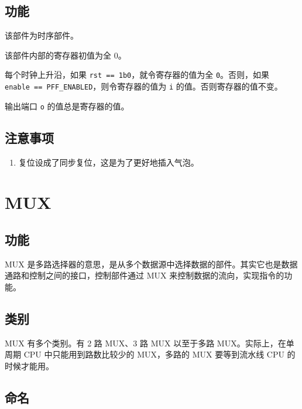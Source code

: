 \documentclass[12pt,AutoFakeBold,AutoFakeSlant]{article}
\providecommand{\tightlist}{%
  \setlength{\itemsep}{0pt}\setlength{\parskip}{0pt}}
\begin{document}
\hypertarget{ux529fux80fd-10}{%
\subsection{功能}\label{ux529fux80fd-10}}

该部件为时序部件。

该部件内部的寄存器初值为全 0。

每个时钟上升沿，如果
\texttt{rst\ ==\ 1\textquotesingle{}b0}，就令寄存器的值为全
\texttt{0}。否则，如果
\texttt{enable\ ==\ PFF\_ENABLED}，则令寄存器的值为 \texttt{i}
的值。否则寄存器的值不变。

输出端口 \texttt{o} 的值总是寄存器的值。

\hypertarget{ux6ce8ux610fux4e8bux9879-6}{%
\subsection{注意事项}\label{ux6ce8ux610fux4e8bux9879-6}}

\begin{enumerate}
\def\labelenumi{\arabic{enumi}.}
\tightlist
\item
  复位设成了同步复位，这是为了更好地插入气泡。
\end{enumerate}

\hypertarget{mux}{%
\section{MUX}\label{mux}}

\hypertarget{ux529fux80fd-11}{%
\subsection{功能}\label{ux529fux80fd-11}}

MUX
是多路选择器的意思，是从多个数据源中选择数据的部件。其实它也是数据通路和控制之间的接口，控制部件通过
MUX 来控制数据的流向，实现指令的功能。

\hypertarget{ux7c7bux522b}{%
\subsection{类别}\label{ux7c7bux522b}}

MUX 有多个类别。有 2 路 MUX、3 路 MUX 以至于多路 MUX。实际上，在单周期
CPU 中只能用到路数比较少的 MUX，多路的 MUX 要等到流水线 CPU
的时候才能用。

\hypertarget{ux547dux540d}{%
\subsection{命名}\label{ux547dux540d}}
\end{document}
